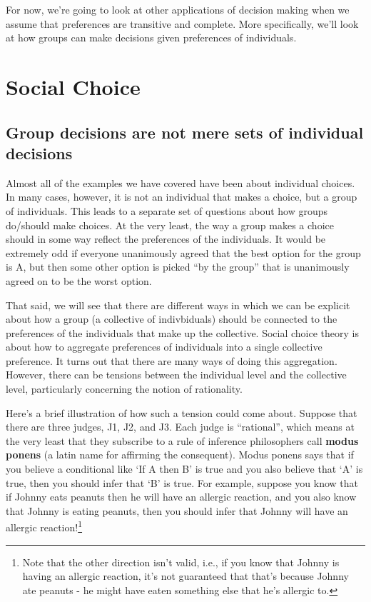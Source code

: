 \documentclass[]{tufte-book}
\begin{document}
For now, we're going to look at other applications of decision making when we assume that preferences are transitive and complete. More specifically, we'll look at how groups can make decisions given preferences of individuals.

\hypertarget{social-choice}{%
\section{Social Choice}\label{social-choice}}

\hypertarget{group-decisions-are-not-mere-sets-of-individual-decisions}{%
\subsection{Group decisions are not mere sets of individual decisions}\label{group-decisions-are-not-mere-sets-of-individual-decisions}}

Almost all of the examples we have covered have been about individual choices. In many cases, however, it is not an individual that makes a choice, but a group of individuals. This leads to a separate set of questions about how groups do/should make choices. At the very least, the way a group makes a choice should in some way reflect the preferences of the individuals. It would be extremely odd if everyone unanimously agreed that the best option for the group is A, but then some other option is picked ``by the group'' that is unanimously agreed on to be the worst option.

That said, we will see that there are different ways in which we can be explicit about how a group (a collective of indivbiduals) should be connected to the preferences of the individuals that make up the collective. Social choice theory is about how to aggregate preferences of individuals into a single collective preference. It turns out that there are many ways of doing this aggregation. However, there can be tensions between the individual level and the collective level, particularly concerning the notion of rationality.

Here's a brief illustration of how such a tension could come about. Suppose that there are three judges, J1, J2, and J3. Each judge is ``rational'', which means at the very least that they subscribe to a rule of inference philosophers call \textbf{modus ponens} (a latin name for affirming the consequent). Modus ponens says that if you believe a conditional like `If A then B' is true and you also believe that `A' is true, then you should infer that `B' is true. For example, suppose you know that if Johnny eats peanuts then he will have an allergic reaction, and you also know that Johnny is eating peanuts, then you should infer that Johnny will have an allergic reaction!\footnote{Note that the other direction isn't valid, i.e., if you know that Johnny is having an allergic reaction, it's not guaranteed that that's because Johnny ate peanuts - he might have eaten something else that he's allergic to.}
\end{document}

